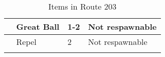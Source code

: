 \begin{longtable}{|| l l l l ||}%
\hline%
&Great Ball&1{-}2&Not respawnable\\%
\hline%
&Repel&2&Not respawnable\\%
\hline%
\endhead%
\hline%
\caption{Items in Route 203}%
\label{tab:Route203Items}%
\end{longtable}